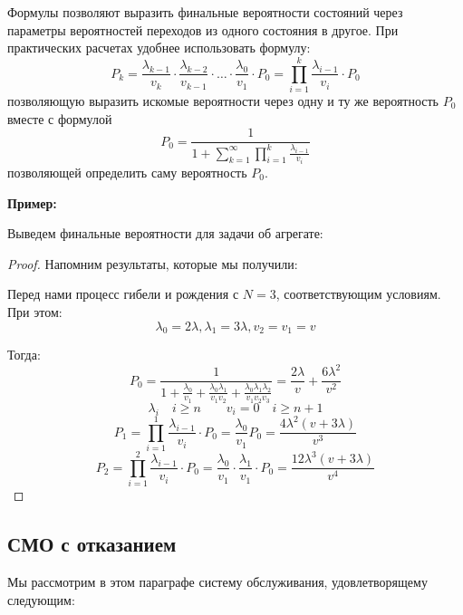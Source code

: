 \documentclass[aps,%
12pt,%
final,%
oneside,
onecolumn,%
musixtex, %
superscriptaddress,%
centertags]{article} %
\theoremstyle{plain}
\theoremstyle{definition}
\theoremstyle{remark}
\begin{document}
Формулы позволяют выразить финальные вероятности состояний через параметры вероятностей переходов из одного состояния в другое. При практических расчетах удобнее использовать формулу:
$$P_k = \frac{\lambda_{k-1}}{v_k} \cdot \frac{\lambda_{k-2}}{v_{k-1}} \cdot \ldots \cdot\frac{\lambda_0}{v_1} \cdot P_0 = \prod_{i=1}^k \frac{\lambda_{i-1}}{v_i} \cdot P_0$$
позволяющую выразить искомые вероятности через одну и ту же вероятность $P_0$ вместе с формулой 
$$P_0 = \frac{1}{1+ \sum\limits_{k=1}^{\infty} \prod\limits_{i=1}^k \frac{\lambda_{i-1}}{v_i}}$$
позволяющей определить саму вероятность $P_0$.

\textbf{Пример:}

Выведем финальные вероятности для задачи об агрегате:
\begin{proof}
	Напомним результаты, которые мы получили:

	Перед нами процесс гибели и рождения с $N=3$, соответствующим условиям. При этом:
	$$\lambda_0 = 2\lambda, \lambda_1 = 3\lambda, v_2 = v_1 = v$$

	Тогда:
	$$P_0 = \frac{1}{1+\frac{\lambda_0}{v_1} + \frac{\lambda_0\lambda_1}{v_1v_2} + \frac{\lambda_0\lambda_1\lambda_2}{v_1v_2v_3}} = \frac{2\lambda}{v} + \frac{6\lambda^2}{v^2}$$
	$$\lambda_i \quad i \geq n \qquad  v_i = 0 \quad i\geq n+1$$
	$$P_1 =  \prod_{i=1}^1 \frac{\lambda_{i-1}}{v_i} \cdot P_0 = \frac{\lambda_0}{v_1}P_0 = \frac{4\lambda^2(v+3\lambda)}{v^3}$$
	$$P_2 =  \prod_{i=1}^2 \frac{\lambda_{i-1}}{v_i} \cdot P_0 = \frac{\lambda_0}{v_1} \cdot \frac{\lambda_1}{v_1} \cdot P_0 = \frac{12\lambda^3(v+3\lambda)}{v^4}$$
\end{proof}

\newpage
\subsection{СМО с отказанием}

Мы рассмотрим в этом параграфе систему обслуживания, удовлетворящему следующим:
\end{document}
